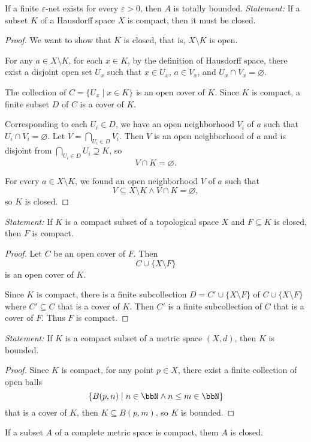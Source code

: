 \documentclass[a4paper,12pt]{article}
\begin{document}
If a finite $\varepsilon$-net exists for every $\varepsilon>0$, then $A$ is totally bounded.
\textit{Statement:} If a subset $K$ of a Hausdorff space $X$ is compact, then it must be closed.

\begin{proof}
We want to show that $K$ is closed, that is, $X\setminus K$ is open.

For any $a\in X\setminus K$, for each $x\in K$, by the definition of Hausdorff space, there exist a disjoint open set $U_x$ such that $x\in U_x$, $a\in V_x$, and $U_x\cap V_x=\varnothing$.

The collection of $C=\{U_x\mid x\in K\}$ is an open cover of $K$. Since $K$ is compact, a finite subset $D$ of $C$ is a cover of $K$.

Corresponding to each $U_i\in D$, we have an open neighborhood $V_i$ of $a$ such that $U_i\cap V_i=\varnothing$. Let $V=\bigcap_{U_i\in D}V_i$. Then $V$ is an open neighborhood of $a$ and is disjoint from $\bigcap_{U_i\in D}U_i\supseteq K$, so
\[V\cap K=\varnothing.\]

For every $a\in X\setminus K$, we found an open neighborhood $V$ of $a$ such that
\[V\subseteq X\setminus K\land V\cap K=\varnothing,\]
so $K$ is closed.
\end{proof}
\textit{Statement:} If $K$ is a compact subset of a topological space $X$ and $F\subseteq K$ is closed, then $F$ is compact.

\begin{proof}
Let $C$ be an open cover of $F$. Then
\[C\cup\{X\setminus F\}\]
is an open cover of $K$.

Since $K$ is compact, there is a finite subcollection $D=C'\cup\{X\setminus F\}$ of $C\cup\{X\setminus F\}$ where $C'\subseteq C$ that is a cover of $K$. Then $C'$ is a finite subcollection of $C$ that is a cover of $F$. Thus $F$ is compact.
\end{proof}
\textit{Statement:} If $K$ is a compact subset of a metric space $(X,d)$, then $K$ is bounded.

\begin{proof}
Since $K$ is compact, for any point $p\in X$, there exist a finite collection of open balls
\[\{B(p,n)\mid n\in\bbN\land n\leq m\in\bbN\}\]
that is a cover of $K$, then $K\subseteq B(p,m)$, so $K$ is bounded.
\end{proof}
 If a subset $A$ of a complete metric space is compact, them $A$ is closed.
\end{document}
